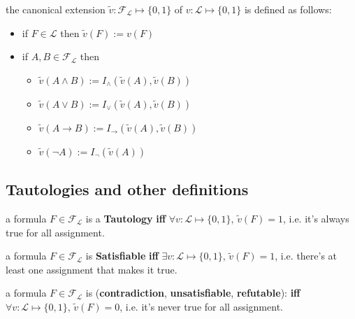   	\begin{definition} the canonical extension $\tilde{v}: \mathcal{F}_{\mathcal{L}} \mapsto \{0,1\}$ of $v : \mathcal{L} \mapsto \{0,1\}$ is defined as follows:
	\begin{itemize}
		\item if $F \in \mathcal{L}$ then $\tilde{v} (F) := v(F)$
		\item if $A, B \in \mathcal{F}_{\mathcal{L}}$ then
		\begin{itemize}[label=]
			\item $\tilde{v} (A \wedge B) := I_\wedge (\tilde{v} (A), \tilde{v} (B))$
			\item $\tilde{v} (A \vee B) := I_\vee (\tilde{v} (A), \tilde{v} (B))$
			\item $\tilde{v} (A \rightarrow B) := I_\rightarrow (\tilde{v} (A), \tilde{v} (B))$
			\item $\tilde{v} (\neg A) := I_\neg (\tilde{v} (A))$
		\end{itemize}
	\end{itemize}
  \end{definition}


	\newpage

	\subsection{Tautologies and other definitions}
	\begin{definition}[Tautology] a formula $F  \in \mathcal{F}_\mathcal{L}$ is a \textbf{Tautology} \textbf{iff}  $\forall v: \mathcal{L} \mapsto \{0,1\}, \, \tilde{v} (F) = 1$, i.e. it's always true for all assignment.
	  \end{definition}

	\begin{definition} a formula $F \in \mathcal{F}_\mathcal{L}$ is \textbf{Satisfiable} \textbf{iff}  $\exists v: \mathcal{L} \mapsto \{0,1\}, \, \tilde{v} (F) = 1$, i.e. there's at least one assignment that makes it true.
	\end{definition}

	\begin{definition} a formula $F \in \mathcal{F}_\mathcal{L}$ is (\textbf{contradiction}, \textbf{unsatisfiable}, \textbf{refutable}):
	\textbf{iff}  $\forall v: \mathcal{L} \mapsto \{0,1\}, \, \tilde{v} (F) = 0$, i.e. it's never true for all assignment.
  \end{definition}

